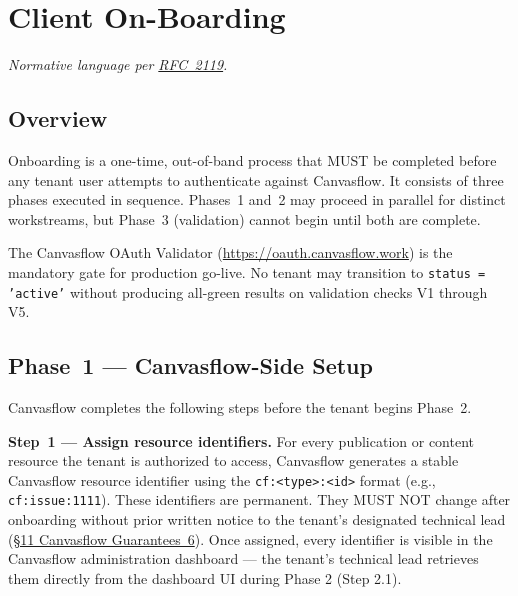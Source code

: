 
\section{Client On-Boarding}\label{sec:on-boarding}

\textit{Normative language per \href{https://tools.ietf.org/html/rfc2119}{RFC~2119}.}

\subsection{Overview}

Onboarding is a one-time, out-of-band process that MUST be completed before any tenant
user attempts to authenticate against Canvasflow. It consists of three phases executed
in sequence. Phases~1 and~2 may proceed in parallel for distinct workstreams, but
Phase~3 (validation) cannot begin until both are complete.

The Canvasflow OAuth Validator (\url{https://oauth.canvasflow.work}) is the mandatory
gate for production go-live. No tenant may transition to \texttt{status = 'active'}
without producing all-green results on validation checks V1 through V5.

\subsection{Phase~1 --- Canvasflow-Side Setup}\label{sec:canvasflow-side-setup}

Canvasflow completes the following steps before the tenant begins Phase~2.



\textbf{Step~1 --- Assign resource identifiers.} For every publication or content
resource the tenant is authorized to access, Canvasflow generates a stable Canvasflow
resource identifier using the \texttt{cf:<type>:<id>} format (e.g.,
\texttt{cf:issue:1111}). These identifiers are permanent. They MUST NOT change after
onboarding without prior written notice to the tenant's designated technical lead
(\hyperref[sec:canvasflow-guarantees]{\S11 Canvasflow Guarantees~6}). Once assigned, every identifier is visible in 
the Canvasflow administration dashboard — the tenant's 
technical lead retrieves them directly from the dashboard UI during Phase 2 (Step 2.1).

